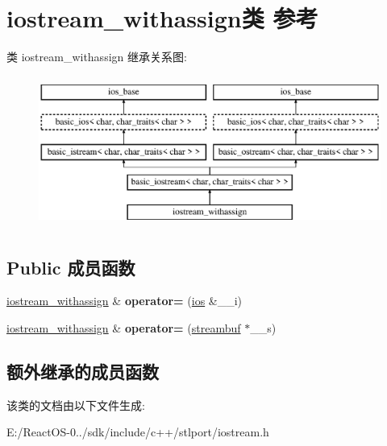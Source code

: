 \hypertarget{classiostream__withassign}{}\section{iostream\+\_\+withassign类 参考}
\label{classiostream__withassign}
类 iostream\+\_\+withassign 继承关系图\+:\begin{figure}[H]
\begin{center}
\leavevmode
\includegraphics[height=5.000000cm]{classiostream__withassign}
\end{center}
\end{figure}
\subsection*{Public 成员函数}
\begin{DoxyCompactItemize}
\item 
\mbox{\label{classiostream__withassign_a93aa1f89c48aafef8a6383833c30b04a}} 
\hyperlink{classiostream__withassign}{iostream\+\_\+withassign} \& {\bfseries operator=} (\hyperlink{classbasic__ios}{ios} \&\+\_\+\+\_\+i)
\item 
\mbox{\label{classiostream__withassign_aa61cda1f23de2c5b0a0eb0edf741ad86}} 
\hyperlink{classiostream__withassign}{iostream\+\_\+withassign} \& {\bfseries operator=} (\hyperlink{classbasic__streambuf}{streambuf} $\ast$\+\_\+\+\_\+s)
\end{DoxyCompactItemize}
\subsection*{额外继承的成员函数}


该类的文档由以下文件生成\+:\begin{DoxyCompactItemize}
\item 
E\+:/\+React\+O\+S-\/0../sdk/include/c++/stlport/iostream.\+h\end{DoxyCompactItemize}
